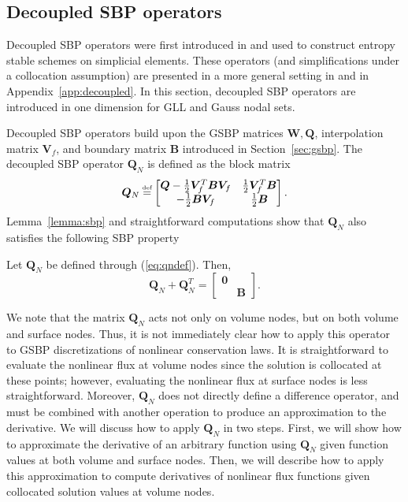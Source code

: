 \documentclass[review,onefignum,onetabnum,final]{siamart171218}
\newcommand\myeq{\mathrel{\stackrel{\makebox[0pt]{\mbox{\normalfont\tiny def}}}{=}}}
\begin{document}
\subsection{Decoupled SBP operators}

Decoupled SBP operators were first introduced in \cite{chan2017discretely} and used to construct entropy stable schemes on simplicial elements.  These operators (and simplifications under a collocation assumption) are presented in a more general setting in \cite{chan2017discretely, chan2018discretely} and in Appendix~\ref{app:decoupled}.  In this section, decoupled SBP operators are introduced in one dimension for GLL and Gauss nodal sets.  

Decoupled SBP operators build upon the GSBP matrices $\bm{W}, \bm{Q}$, interpolation matrix $\bm{V}_f$, and boundary matrix $\bm{B}$ introduced in Section~\ref{sec:gsbp}.  The decoupled SBP operator $\bm{Q}_N$ is defined as the block matrix 
\begin{equation}
\bm{Q}_N \myeq \begin{bmatrix}
\bm{Q} - \frac{1}{2}\bm{V}_f^T\bm{B}\bm{V}_f & \frac{1}{2}\bm{V}_f^T\bm{B}\\
-\frac{1}{2}\bm{B}\bm{V}_f & \frac{1}{2}\bm{B}
\end{bmatrix}.
\label{eq:qndef}
\end{equation}
Lemma~\ref{lemma:sbp} and straightforward computations show that $\bm{Q}_N$ also satisfies the following SBP property
\begin{lemma}
\label{lemma:dsbp}
Let $\bm{Q}_N$ be defined through (\ref{eq:qndef}).  Then,
\[
\bm{Q}_N + \bm{Q}_N^T = \begin{bmatrix}
\bm{0} &\\
& \bm{B}
\end{bmatrix}.
\]
\end{lemma}

We note that the matrix $\bm{Q}_N$ acts not only on volume nodes, but on both volume and surface nodes.  Thus, it is not immediately clear how to apply this operator to GSBP discretizations of nonlinear conservation laws.  It is straightforward to evaluate the nonlinear flux at volume nodes since the solution is collocated at these points; however, evaluating the nonlinear flux at surface nodes is less straightforward.  Moreover, $\bm{Q}_N$ does not directly define a difference operator, and must be combined with another operation to produce an approximation to the derivative.  We will discuss how to apply $\bm{Q}_N$ in two steps.  First, we will show how to approximate the derivative of an arbitrary function using $\bm{Q}_N$ given function values at both volume and surface nodes.  Then, we will describe how to apply this approximation to compute derivatives of nonlinear flux functions given collocated solution values at volume nodes.    
\end{document}
